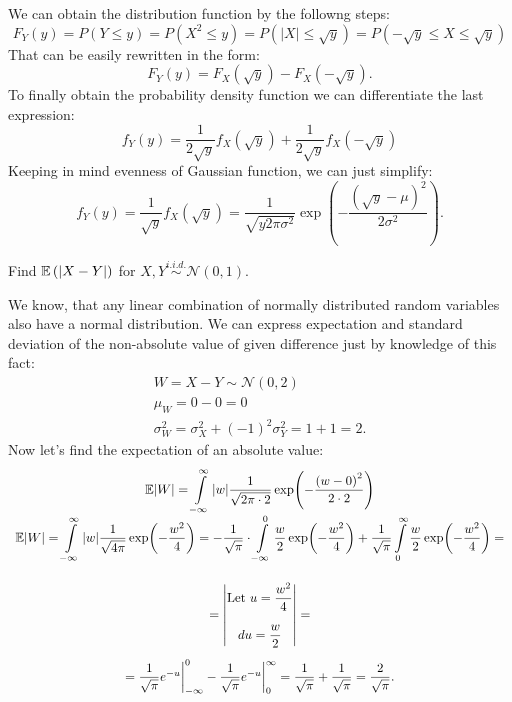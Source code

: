 \documentclass[12pt]{report}
\begin{document}
\begin{solution}
    We can obtain the distribution function by the followng steps:
    \[
        F_Y(y) = P(Y \leq y) = P\left(X^2 \leq y\right) = P\left(|X| \leq \sqrt{y}\right) = P\left(- \sqrt{y} \leq X \leq \sqrt{y}\right) 
    \]
    That can be easily rewritten in the form:
    \[
        F_Y(y) = F_X(\sqrt{y}) - F_X(-\sqrt{y}).
    \]
    To finally obtain the probability density function we can differentiate the last expression:
    \[
        f_Y(y) = \dfrac{1}{2\sqrt{y}} f_X(\sqrt{y}) + \dfrac{1}{2\sqrt{y}} f_X(-\sqrt{y}) 
    \]
    Keeping in mind evenness of Gaussian function, we can just simplify:
    \[
        f_Y(y) = \dfrac{1}{\sqrt{y}} f_X(\sqrt{y}) = \dfrac{1}{\sqrt{y2\pi\sigma^2}} \exp(-\dfrac{\left(\sqrt{y} - \mu\right)^2}{2\sigma^2}).
    \]
\end{solution}

\begin{problem}{}
    Find $\mathbb{E}\left(|X-Y|\right)$ for $X, Y \overset{i.i.d.}{\sim} \mathcal{N}(0,1)$.
\end{problem}

\begin{solution}
    We know, that any linear combination of normally distributed random variables also have a normal distribution. We can express expectation and standard deviation of the non-absolute value of given difference just by knowledge of this fact:
    \[
        \begin{array}{c}
            \displaystyle W = X - Y \sim \mathcal{N}(0, 2)\\
            \displaystyle \mu_W = 0 - 0 = 0\\
            \displaystyle \sigma^2_W = \sigma^2_X + (-1)^2 \sigma^2_Y = 1 + 1 = 2.
        \end{array}  
    \]
    Now let's find the expectation of an absolute value:
    \[
        \begin{array}{c} 
            \displaystyle \mathbb{E} |W| = \int\limits_{-\infty}^\infty |w| \dfrac{1}{\sqrt{2\pi\cdot 2}} \exp(-\dfrac{\left(w - 0\right)^2}{2\cdot 2}) \\ 
            \displaystyle 
            \mathbb{E} |W| = \int\limits_{-\infty}^\infty |w| \dfrac{1}{\sqrt{4\pi}} \exp(-\dfrac{w^2}{4}) = - \dfrac{1}{\sqrt{\pi}} \cdot \int \limits_{-\infty}^0 \dfrac{w}{2} \exp(-\dfrac{w^2}{4}) + \dfrac{1}{\sqrt{\pi}} \int\limits_{0}^\infty \dfrac{w}{2}\exp(-\dfrac{w^2}{4}) = \\[1cm]
            \displaystyle = \begin{vmatrix}
                \text{Let } u = \dfrac{w^2}{4} \\[0.5cm]
                du = \dfrac{w}{2} 
            \end{vmatrix} = \\[1cm]
            = \dfrac{1}{\sqrt{\pi}} e^{-u} \bigg|^0_{-\infty} - \dfrac{1}{\sqrt{\pi}} e^{-u} \bigg|^\infty_0 = \dfrac{1}{\sqrt{\pi}} + \dfrac{1}{\sqrt{\pi}} = \dfrac{2}{\sqrt{\pi}}.
        \end{array}
    \]
\end{solution}
\end{document}
